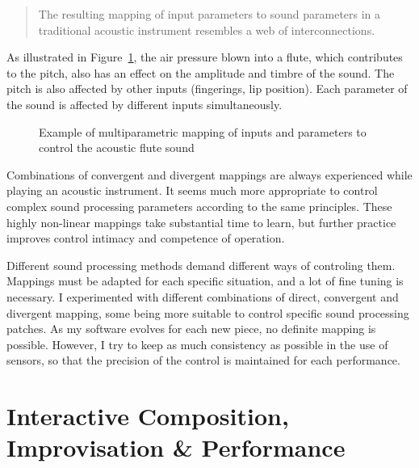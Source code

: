 \begin{quotation}
The resulting mapping of input parameters to sound parameters in a traditional acoustic instrument resembles a web of interconnections. \cite[p.235]{Hunt:2000} 
\end{quotation}

As illustrated in Figure~\ref{Palacio-Quintin:mapping}, the air pressure blown into a flute, which contributes to the pitch, also has an effect on the amplitude and timbre of the sound. The pitch is also affected by other inputs (fingerings, lip position). Each parameter of the sound is affected by different inputs simultaneously. 

\begin{figure}
\centerline{}
\caption{Example of multiparametric mapping of inputs and parameters to control the acoustic flute sound}
\label{Palacio-Quintin:mapping}
\end{figure}

Combinations of convergent and divergent mappings are always experienced while playing an acoustic instrument. It seems much more appropriate to control complex sound processing parameters according to the same principles. These highly non-linear mappings take substantial time to learn, but further practice improves control intimacy and competence of operation.

Different sound processing methods demand different ways of controling them. Mappings must be adapted for each specific situation, and a lot of fine tuning is necessary. I experimented with different combinations of direct, convergent and divergent mapping, some being more suitable to control specific sound processing patches. As my software evolves for each new piece, no definite mapping is possible. However, I try to keep as much consistency as possible in the use of sensors, so that the precision of the control is maintained for each performance. 


\section{Interactive Composition, Improvisation \& Performance}

